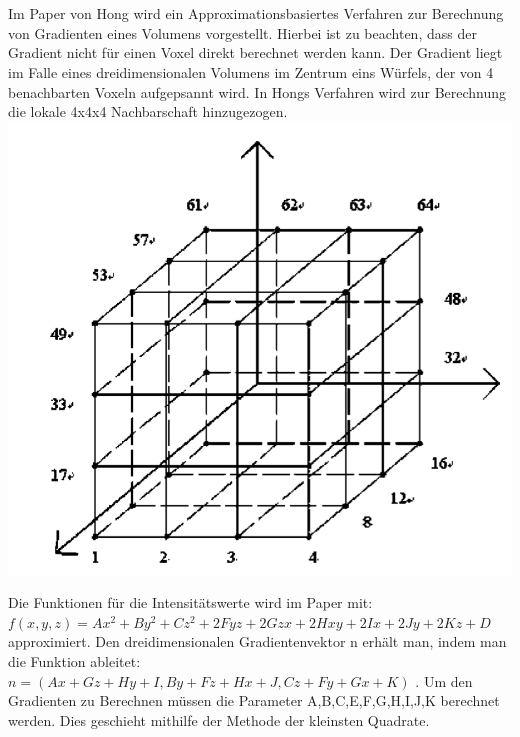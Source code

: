 \chapter{}
\label{sec:methods}



Im Paper von Hong \cite{hong2003method} wird ein Approximationsbasiertes Verfahren zur Berechnung von Gradienten eines Volumens vorgestellt. 
\newline
Hierbei ist zu beachten, dass der Gradient nicht für einen Voxel direkt berechnet werden kann. Der Gradient liegt im Falle eines dreidimensionalen Volumens im Zentrum eins Würfels, der von 4 benachbarten Voxeln aufgepsannt wird. In Hongs Verfahren wird zur Berechnung die lokale 4x4x4 Nachbarschaft hinzugezogen.
\newline
\includegraphics[width=\textwidth]{Logos/VoxelEdges.PNG}

Die Funktionen für die Intensitätswerte wird im Paper mit:  $f(x,y,z) = Ax^{2}+By^{2}+Cz^{2}+2Fyz+2Gzx+2Hxy+2Ix+2Jy+2Kz+D$  approximiert. Den dreidimensionalen Gradientenvektor n erhält man, indem man die Funktion ableitet: $n = (Ax+Gz+Hy+I, By+Fz+Hx+J, Cz + Fy + Gx + K)$ .
\newline
Um den Gradienten zu Berechnen müssen die Parameter A,B,C,E,F,G,H,I,J,K  berechnet werden. Dies geschieht mithilfe der Methode der kleinsten Quadrate.
